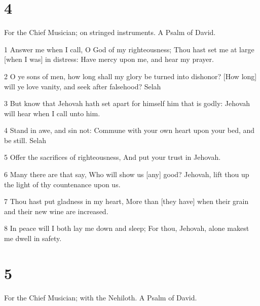 \chapter{4}

\par For the Chief Musician; on stringed instruments. A Psalm of David.

\par 1 Answer me when I call, O God of my righteousness; Thou hast set me at large [when I was] in distress: Have mercy upon me, and hear my prayer.
\par 2 O ye sons of men, how long shall my glory be turned into dishonor? [How long] will ye love vanity, and seek after falsehood? Selah
\par 3 But know that Jehovah hath set apart for himself him that is godly: Jehovah will hear when I call unto him.
\par 4 Stand in awe, and sin not: Commune with your own heart upon your bed, and be still. Selah
\par 5 Offer the sacrifices of righteousness, And put your trust in Jehovah.
\par 6 Many there are that say, Who will show us [any] good? Jehovah, lift thou up the light of thy countenance upon us.
\par 7 Thou hast put gladness in my heart, More than [they have] when their grain and their new wine are increased.
\par 8 In peace will I both lay me down and sleep; For thou, Jehovah, alone makest me dwell in safety.

\chapter{5}

\par For the Chief Musician; with the Nehiloth. A Psalm of David.

